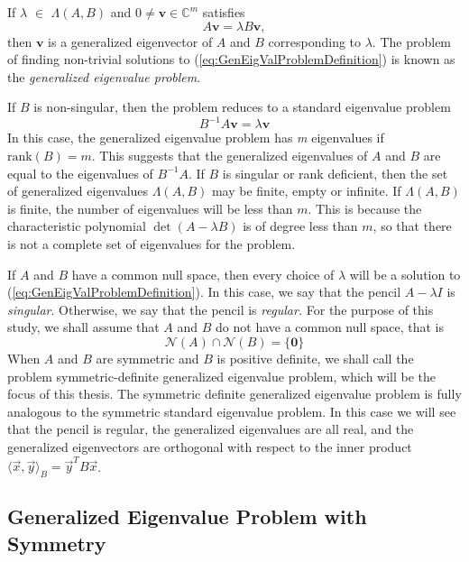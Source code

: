 If $\lambda$ $\in$ $\Lambda(A, B)$ and $0 \neq \mathbf{v} \in \mathbb{C}^m$ satisfies
\begin{equation}\label{eq:GenEigValProblemDefinition}
	A\mathbf{v} = \lambda B\mathbf{v},
\end{equation}
then $\mathbf{v}$ is a generalized eigenvector of $A$ and $B$ corresponding to $\lambda$. The problem of finding non-trivial solutions to (\ref{eq:GenEigValProblemDefinition}) is known as the \textit{generalized eigenvalue problem}.

If $B$ is non-singular, then the problem reduces to a standard eigenvalue problem
\begin{equation}\label{eq:StandardReduction}
	B^{-1}A \mathbf{v} = \lambda \mathbf{v}
\end{equation}
In this case, the generalized eigenvalue problem has \textit{m} eigenvalues if $\text{rank}(B) = m$. This suggests that the generalized eigenvalues of $A$ and $B$ are equal to the eigenvalues of $B^{-1}A$. If $B$ is singular or rank deficient, then the set of generalized eigenvalues $\Lambda(A, B)$ may be finite, empty or infinite. If $\Lambda(A, B)$ is finite, the number of eigenvalues will be less than $m$. This is because the characteristic polynomial $\det(A- \lambda B)$ is of degree less than $m$, so that there is not a complete set of eigenvalues for the problem.

If $A$ and $B$ have a  common null space, then every choice of $\lambda$ will be a solution to (\ref{eq:GenEigValProblemDefinition}). In this case, we say that the pencil $A-\lambda I$ is {\em singular}.  Otherwise, we say that the pencil is {\em regular.}   For the purpose of this study, we shall assume that $A$ and $B$ do not have a  common null space, that is
\begin{equation}\label{eq:EmptyCommonNullSpace}
	\mathcal{N}(A) \cap \mathcal{N}(B) = \{\mathbf{0} \}
\end{equation}
When $A$ and $B$ are symmetric and $B$ is positive definite, we shall call the problem symmetric-definite generalized eigenvalue problem, which will be the focus of this thesis. The symmetric definite generalized eigenvalue problem is fully analogous to the symmetric standard eigenvalue problem.  In this case we will see that the pencil is regular, the generalized eigenvalues are all real, and the generalized eigenvectors are orthogonal with respect to the inner product $\langle\vec{x}, \vec{y}\rangle_B = \vec{y}^T B \vec{x}$.

\subsection{Generalized Eigenvalue Problem with Symmetry}\label{sec:ProblemDiscussion}

